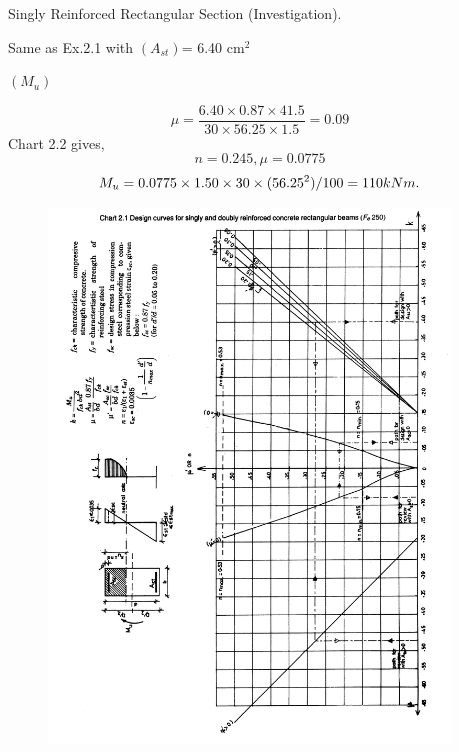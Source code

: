 \begin{example} Singly Reinforced Rectangular Section (Investigation).

\given Same as Ex.2.1 with $(A_{st})$= 6.40 cm$^{2}$

\required $(M_{u})$

\solution
$$\mu=\frac{6.40 \times 0.87 \times 41.5}{30 \times 56.25 \times 1.5} =0.09$$
Chart 2.2 gives,
$$n=0.245, \mu=0.0775$$
$$M_{u}=0.0775 \times 1.50 \times 30 \times (56.25^2)/100= 110kNm.$$
\end{example}
\newpage
\begin{figure}
\centering
\includegraphics[width=0.95\textwidth]{images/ch2-5.png}
\caption{}
\label{fig:Values for parameters}
\end{figure}
\newpage

